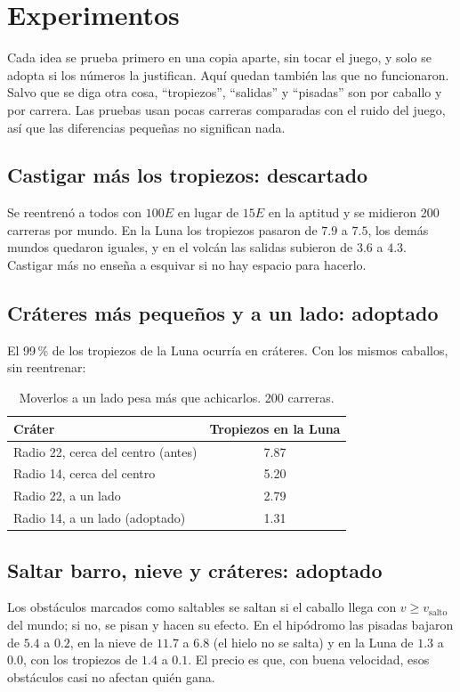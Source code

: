 \documentclass[11pt,letterpaper]{article}
\begin{document}
\section{Experimentos}
Cada idea se prueba primero en una copia aparte, sin tocar el juego, y solo se adopta si los números la justifican. Aquí quedan también las que no funcionaron. Salvo que se diga otra cosa, ``tropiezos'', ``salidas'' y ``pisadas'' son por caballo y por carrera. Las pruebas usan pocas carreras comparadas con el ruido del juego, así que las diferencias pequeñas no significan nada.

\subsection{Castigar más los tropiezos: descartado}
Se reentrenó a todos con $100E$ en lugar de $15E$ en la aptitud y se midieron 200 carreras por mundo. En la Luna los tropiezos pasaron de $7.9$ a $7.5$, los demás mundos quedaron iguales, y en el volcán las salidas subieron de $3.6$ a $4.3$. Castigar más no enseña a esquivar si no hay espacio para hacerlo.

\subsection{Cráteres más pequeños y a un lado: adoptado}
El 99\,\% de los tropiezos de la Luna ocurría en cráteres. Con los mismos caballos, sin reentrenar:

\begin{table}[h]\centering
\begin{tabular}{lc}
\toprule
Cráter & Tropiezos en la Luna \\
\midrule
Radio 22, cerca del centro (antes) & 7.87 \\
Radio 14, cerca del centro & 5.20 \\
Radio 22, a un lado & 2.79 \\
Radio 14, a un lado (adoptado) & 1.31 \\
\bottomrule
\end{tabular}
\caption{Moverlos a un lado pesa más que achicarlos. 200 carreras.}
\end{table}

\subsection{Saltar barro, nieve y cráteres: adoptado}
Los obstáculos marcados como saltables se saltan si el caballo llega con $v \ge v_{\text{salto}}$ del mundo; si no, se pisan y hacen su efecto. En el hipódromo las pisadas bajaron de $5.4$ a $0.2$, en la nieve de $11.7$ a $6.8$ (el hielo no se salta) y en la Luna de $1.3$ a $0.0$, con los tropiezos de $1.4$ a $0.1$. El precio es que, con buena velocidad, esos obstáculos casi no afectan quién gana.
\end{document}
